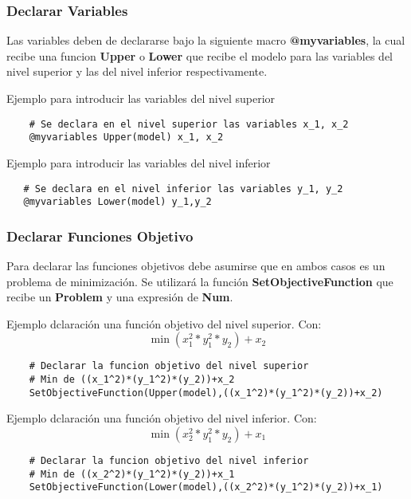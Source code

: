 \subsubsection{Declarar Variables}
Las variables deben de 
declararse bajo la siguiente macro \textbf{@myvariables}, la cual 
recibe una funcion \textbf{Upper} o \textbf{Lower} que recibe el modelo
para las variables del nivel superior y las del nivel inferior respectivamente.

Ejemplo para introducir las variables del nivel superior
\begin{lstlisting}
    # Se declara en el nivel superior las variables x_1, x_2
    @myvariables Upper(model) x_1, x_2
\end{lstlisting}

Ejemplo para introducir las variables del nivel inferior
\begin{lstlisting}
   # Se declara en el nivel inferior las variables y_1, y_2
   @myvariables Lower(model) y_1,y_2
\end{lstlisting}


\subsubsection{Declarar Funciones Objetivo}

Para declarar las funciones objetivos debe asumirse que en ambos casos es un 
problema de minimización. Se utilizará la función \textbf{SetObjectiveFunction}
que recibe un \textbf{Problem} y una expresión de \textbf{Num}.

Ejemplo dclaración una función objetivo del nivel superior.
Con: $$\min (x_1^2*y_1^2*y_2) + x_2$$
\begin{lstlisting}
    # Declarar la funcion objetivo del nivel superior
    # Min de ((x_1^2)*(y_1^2)*(y_2))+x_2
    SetObjectiveFunction(Upper(model),((x_1^2)*(y_1^2)*(y_2))+x_2)
\end{lstlisting}

Ejemplo dclaración una función objetivo del nivel inferior.
Con: $$\min (x_2^2*y_1^2*y_2)+x_1$$
\begin{lstlisting}
    # Declarar la funcion objetivo del nivel inferior
    # Min de ((x_2^2)*(y_1^2)*(y_2))+x_1
    SetObjectiveFunction(Lower(model),((x_2^2)*(y_1^2)*(y_2))+x_1)
\end{lstlisting}

